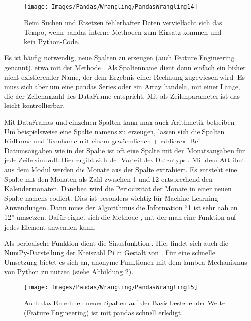\begin{figure}
    \centering
    \texttt{[image: Images/Pandas/Wrangling/PandasWrangling14]}    
    \caption{Beim Suchen und Ersetzen fehlerhafter Daten vervielfacht sich das Tempo, wenn pandas-interne Methoden zum Einsatz kommen und kein Python-Code.} \label{PandasWrangling14}
\end{figure}



Es ist häufig notwendig, neue Spalten zu erzeugen (auch Feature Engineering genannt), etwa mit der Methode . Als Spaltenname dient dann einfach ein bisher nicht existierender Name, der dem Ergebnis einer Rechnung zugewiesen wird. Es muss sich aber um eine pandas Series oder ein Array handeln, mit einer Länge, die der Zeilenanzahl des DataFrame entspricht. Mit \PYTHON{:} als Zeilenparameter ist das leicht kontrollierbar.

Mit DataFrames und einzelnen Spalten kann man auch Arithmetik betreiben. Um beispielsweise eine Spalte namens  zu erzeugen, lassen sich die Spalten Kidhome und Teenhome mit einem gewöhnlichen + addieren. Bei Datumsangaben wie in der Spalte  ist oft eine Spalte mit den Monatsangaben für jede Zeile sinnvoll. Hier ergibt sich der Vorteil des Datentyps . Mit dem Attribut  aus dem Modul  werden die Monate aus der Spalte  extrahiert. Es entsteht eine Spalte mit den Monaten als Zahl zwischen 1 und 12 entsprechend den Kalendermonaten. Daneben wird die Periodizität der Monate in einer neuen Spalte namens  codiert. Dies ist besonders wichtig für Machine-Learning-Anwendungen. Dann muss der Algorithmus die Information ``1 ist sehr nah an 12'' umsetzen. Dafür eignet sich die Methode , mit der man eine Funktion auf jedes Element anwenden kann.

Als periodische Funktion dient die Sinusfunktion . Hier findet sich auch die NumPy-Darstellung der Kreiszahl Pi in Gestalt von . Für eine schnelle Umsetzung bietet es sich an, anonyme Funktionen mit dem lambda-Mechanismus von Python zu nutzen (siehe Abbildung \ref{PandasWrangling15}).

\begin{figure}
    \centering
    \texttt{[image: Images/Pandas/Wrangling/PandasWrangling15]}    
    \caption{Auch das Errechnen neuer Spalten auf der Basis bestehender Werte (Feature Engineering) ist mit pandas schnell erledigt.} \label{PandasWrangling15}
\end{figure}


